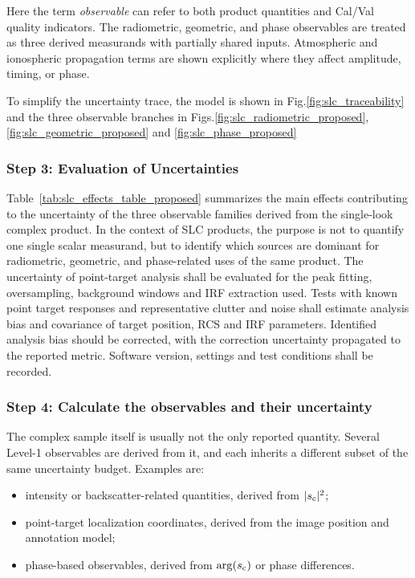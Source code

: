 Here the term \textit{observable} can refer to both product quantities and Cal/Val quality indicators. The radiometric, geometric, and phase observables are treated as three derived measurands with partially shared inputs. Atmospheric and ionospheric
propagation terms are shown explicitly where they affect amplitude, timing, or phase.

To simplify the uncertainty trace, the model is shown in
Fig.\ref{fig:slc_traceability} and the three observable branches in
Figs.\ref{fig:slc_radiometric_proposed}, \ref{fig:slc_geometric_proposed} and \ref{fig:slc_phase_proposed}












\subsubsection{Step 3: Evaluation of Uncertainties}

Table~\ref{tab:slc_effects_table_proposed} summarizes the main effects contributing to
the uncertainty of the three observable families derived from the single-look
complex product. In the context of SLC products, the purpose is not
to quantify one single scalar measurand, but to identify which sources are dominant for radiometric, geometric, and phase-related uses of the same product. The uncertainty of point-target analysis shall be evaluated for the peak fitting, oversampling, background windows and IRF extraction used. Tests with known point target responses and representative clutter and noise shall estimate analysis bias and covariance of target position, RCS and IRF parameters. Identified analysis bias should be corrected, with the correction uncertainty propagated to the reported metric. Software version, settings and test conditions shall be recorded.



\subsubsection{Step 4: Calculate the observables and their uncertainty}


The complex sample itself is usually not the only reported quantity. Several
Level-1 observables are derived from it, and each inherits a different subset
of the same uncertainty budget. Examples are:
\begin{itemize}
  \item intensity or backscatter-related quantities, derived from $|s_{\rm c}|^2$;
  \item point-target localization coordinates, derived from the image position
  and annotation model;
  \item phase-based observables, derived from $\arg(s_{\rm c})$ or phase
  differences.
\end{itemize}

